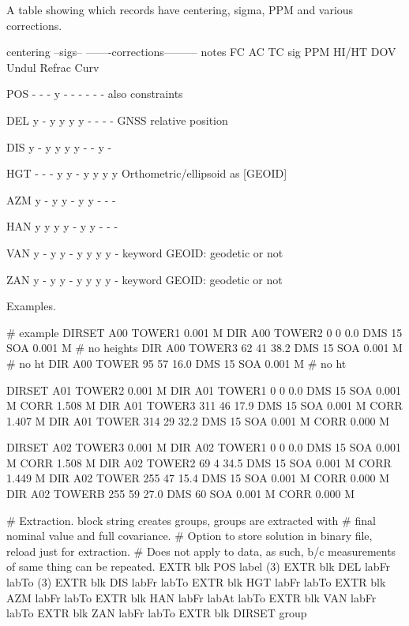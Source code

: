 A table showing which records have centering, sigma, PPM and various corrections.
\begin{Snippet}
      centering    --sigs--   -------corrections---------  notes
      FC  AC  TC   sig  PPM   HI/HT DOV Undul Refrac Curv

POS    -   -   -    y    -      -    -    -     -     -    also constraints

DEL    y   -   y    y    y      y    -    -     -     -    GNSS relative position

DIS    y   -   y    y    y      y    -    -     y     -

HGT    -   -   -    y    y      -    y    y     y     y    Orthometric/ellipsoid
                                                             as [GEOID]

AZM    y   -   y    y    -      y    y    -     -     -

HAN    y   y   y    y    -      y    y    -     -     -

VAN    y   -   y    y    -      y    y    y     y     -    keyword GEOID:
                                                             geodetic or not

ZAN    y   -   y    y    -      y    y    y     y     -    keyword GEOID:
                                                             geodetic or not
\end{Snippet}

Examples.
\begin{Snippet}
# example
DIRSET A00 TOWER1 0.001 M
DIR A00 TOWER2  0  0   0.0 DMS 15 SOA 0.001 M      # no heights
DIR A00 TOWER3 62 41  38.2 DMS 15 SOA 0.001 M      # no ht
DIR A00 TOWER    95 57  16.0 DMS 15 SOA 0.001 M      # no ht

DIRSET A01 TOWER2 0.001 M
DIR A01 TOWER1   0  0  0.0 DMS 15 SOA 0.001 M CORR 1.508 M
DIR A01 TOWER3 311 46 17.9 DMS 15 SOA 0.001 M CORR 1.407 M
DIR A01 TOWER    314 29 32.2 DMS 15 SOA 0.001 M CORR 0.000 M

DIRSET A02 TOWER3 0.001 M
DIR A02 TOWER1   0  0  0.0 DMS 15 SOA 0.001 M CORR 1.508 M
DIR A02 TOWER2  69  4 34.5 DMS 15 SOA 0.001 M CORR 1.449 M
DIR A02 TOWER    255 47 15.4 DMS 15 SOA 0.001 M CORR 0.000 M
DIR A02 TOWERB    255 59 27.0 DMS 60 SOA 0.001 M CORR 0.000 M

# Extraction. block string creates groups, groups are extracted with
#    final nominal value and full covariance.
# Option to store solution in binary file, reload just for extraction.
# Does not apply to data, as such, b/c measurements of same thing can be repeated.
EXTR blk POS label (3)
EXTR blk DEL labFr labTo (3)
EXTR blk DIS labFr labTo
EXTR blk HGT labFr labTo
EXTR blk AZM labFr labTo
EXTR blk HAN labFr labAt labTo
EXTR blk VAN labFr labTo
EXTR blk ZAN labFr labTo
EXTR blk DIRSET group
\end{Snippet}
